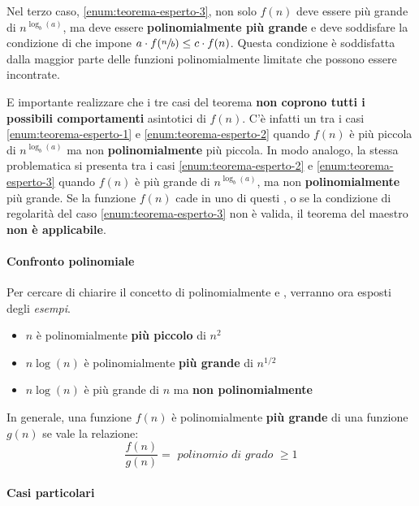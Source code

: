 \documentclass[italian, 10pt]{article}
\begin{document}
Nel terzo caso, \ref{enum:teorema-esperto-3}, non solo \(f(n)\) deve essere più grande di \(n^{\log_b(a)}\), ma deve essere \textbf{polinomialmente più grande} e deve soddisfare la condizione di  che impone \(a \cdot f(\sfrac{n}{b}) \leq c \cdot f(n)\).
Questa condizione è soddisfatta dalla maggior parte delle funzioni polinomialmente limitate che possono essere incontrate.

\bigskip
E importante realizzare che i tre casi del teorema \textbf{non coprono tutti i possibili comportamenti} asintotici di \(f(n)\).
C'è infatti un  tra i casi \ref{enum:teorema-esperto-1} e \ref{enum:teorema-esperto-2} quando \(f(n)\) è più piccola di \(n^{\log_b(a)}\) ma non \textbf{polinomialmente} più piccola.
In modo analogo, la stessa problematica si presenta tra i casi \ref{enum:teorema-esperto-2} e \ref{enum:teorema-esperto-3} quando \(f(n)\) è più grande di \(n^{\log_b(a)}\), ma non \textbf{polinomialmente} più grande.
Se la funzione \(f(n)\) cade in uno di questi , o se la condizione di regolarità del caso \ref{enum:teorema-esperto-3} non è valida, il teorema del maestro \textbf{non è applicabile}.

\paragraph{Confronto polinomiale}

Per cercare di chiarire il concetto di polinomialmente  e , verranno ora esposti degli \textit{esempi}.

\begin{itemize}
  \item \(n\) è polinomialmente \textbf{più piccolo} di \(n^2\)
  \item \(n \log (n)\) è polinomialmente \textbf{più grande} di \(n^{1/2}\)
  \item \(n \log (n)\) è più grande di \(n\) ma \textbf{non polinomialmente}
\end{itemize}

\bigskip
In generale, una funzione \(f(n)\) è polinomialmente \textbf{più grande} di una funzione \(g(n)\) se vale la relazione:
\[\dfrac{f(n)}{g(n)} = \textit{ polinomio di grado } \geq 1 \]

\paragraph{Casi particolari}
\end{document}
